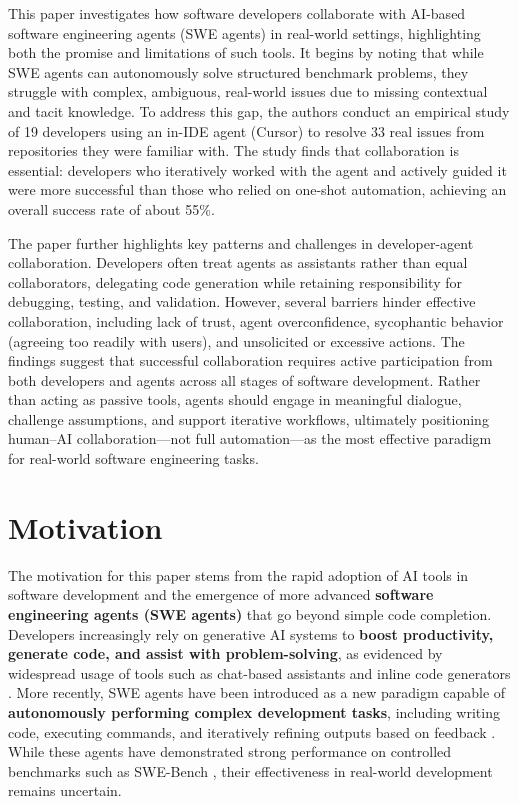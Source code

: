 This paper investigates how software developers collaborate with AI-based software engineering agents (SWE agents) in real-world settings, highlighting both the promise and limitations of such tools.  It begins by noting that while SWE agents can autonomously solve structured benchmark problems, they struggle with complex, ambiguous, real-world issues due to missing contextual and tacit knowledge.  To address this gap, the authors conduct an empirical study of 19 developers using an in-IDE agent (Cursor) to resolve 33 real issues from repositories they were familiar with.  The study finds that collaboration is essential: developers who iteratively worked with the agent and actively guided it were more successful than those who relied on one-shot automation, achieving an overall success rate of about 55\%.

The paper further highlights key patterns and challenges in developer-agent collaboration. Developers often treat agents as assistants rather than equal collaborators, delegating code generation while retaining responsibility for debugging, testing, and validation.  However, several barriers hinder effective collaboration, including lack of trust, agent overconfidence, sycophantic behavior (agreeing too readily with users), and unsolicited or excessive actions.  The findings suggest that successful collaboration requires active participation from both developers and agents across all stages of software development. Rather than acting as passive tools, agents should engage in meaningful dialogue, challenge assumptions, and support iterative workflows, ultimately positioning human–AI collaboration—not full automation—as the most effective paradigm for real-world software engineering tasks.

\section{Motivation}
The motivation for this paper stems from the rapid adoption of AI tools in software development and the emergence of more advanced \textbf{software engineering agents (SWE agents)} that go beyond simple code completion. Developers increasingly rely on generative AI systems to \textbf{boost productivity, generate code, and assist with problem-solving}, as evidenced by widespread usage of tools such as chat-based assistants and inline code generators \cite{stackoverflow2024survey}.  More recently, SWE agents have been introduced as a new paradigm capable of \textbf{autonomously performing complex development tasks}, including writing code, executing commands, and iteratively refining outputs based on feedback \cite{liu2024llmagents}.  While these agents have demonstrated strong performance on controlled benchmarks such as SWE-Bench \cite{jimenez2024swebench}, their effectiveness in real-world development remains uncertain.


